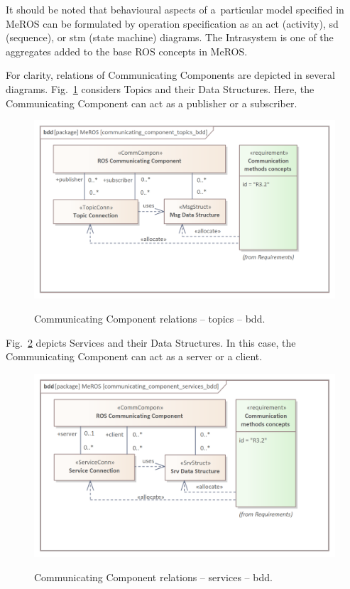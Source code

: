 \documentclass[11pt,oneside,a4paper]{article}
\begin{document}
	It should be noted that behavioural aspects of a~particular model specified in MeROS can be formulated by operation specification as an act (activity), sd (sequence), or stm (state machine) diagrams. The Intrasystem is one of the aggregates added to the base ROS concepts in MeROS. 
	
	\pagebreak
	
	For clarity, relations of Communicating Components are depicted in several diagrams. Fig.~\ref{fig:communicating_component_topics_bdd} considers Topics and their Data Structures. Here, the Communicating Component can act as a publisher or a subscriber.	
	 
	
	\begin{figure}[H]
		\centering
		\begin{center}
			{\includegraphics[scale=1.1]{img/meros_pkg/communicating_component_topics_bdd.png}}
		\end{center}
		\caption{Communicating Component relations -- topics -- bdd.} 
		\label{fig:communicating_component_topics_bdd}
	\end{figure}
	
	Fig.~\ref{fig:communication_blocks_services_bdd} depicts Services and their Data Structures. In this case, the Communicating Component can act as a server or a client.	
	
		
	\begin{figure}[H]
		\centering
		\begin{center}
			{\includegraphics[scale=1.1]{img/meros_pkg/communicating_component_services_bdd.png}}
		\end{center}
		\caption{Communicating Component relations -- services -- bdd.} 
		\label{fig:communication_blocks_services_bdd}
	\end{figure}
	
\end{document}

